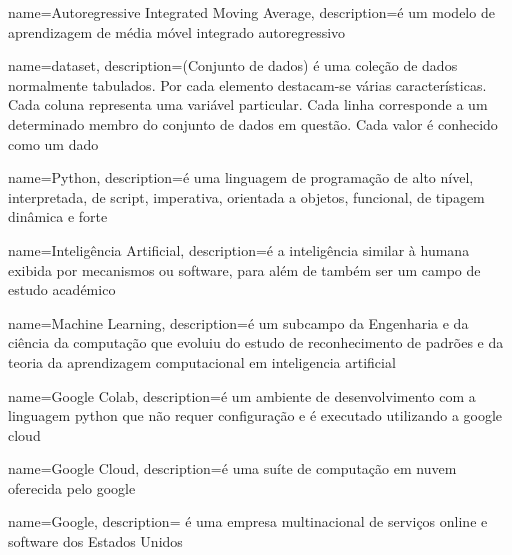 {
    name={Autoregressive Integrated Moving Average},
    description={é um modelo de aprendizagem de média móvel integrado autoregressivo}
}

{
    name={dataset},
    description={(Conjunto de dados) é uma coleção de dados normalmente tabulados. Por
    cada elemento destacam-se várias características. Cada coluna representa uma
    variável particular. Cada linha corresponde a um determinado membro do conjunto de
    dados em questão. Cada valor é conhecido como um dado}
}

{
    name={Python},
    description={é uma linguagem de programação de alto nível, interpretada, de script,
    imperativa, orientada a objetos, funcional, de tipagem dinâmica e forte}
}

{
    name={Inteligência Artificial},
    description={é a inteligência similar à humana exibida por mecanismos ou software,
    para além de também ser um campo de estudo académico}
}

{
    name={Machine Learning},
    description={é um subcampo da Engenharia e da ciência da computação que evoluiu do
    estudo de reconhecimento de padrões e da teoria da aprendizagem computacional em
    \gls{inteligencia artificial}}
}

{
    name={Google Colab},
    description={é um ambiente de desenvolvimento com a linguagem \gls{python} que não
    requer configuração e é executado utilizando a \gls{google cloud}}
}

{
    name={Google Cloud},
    description={é uma suíte de computação em nuvem oferecida pelo \gls{google}}
}

{
    name={Google},
    description={ é uma empresa multinacional de serviços online e software dos
    Estados Unidos}
}